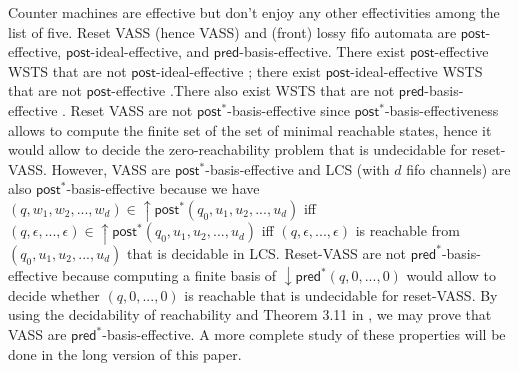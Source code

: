\documentclass[runningheads]{llncs}
\newcommand{\alain}[1]{\todo[inline,color=red!20]{{\bf AF:} #1}}
\newcommand{\pred}{\textsf{pred}}
\newcommand{\post}{\textsf{post}}
\begin{document}
%
Counter machines are effective but don't enjoy any other effectivities among the list of five.
Reset VASS (hence VASS) and (front) lossy fifo automata are $\post$-effective, $\post$-ideal-effective, and $\pred$-basis-effective. There exist $\post$-effective WSTS that are not $\post$-ideal-effective \cite[Proposition~35]{BFM-ic17}; there exist $\post$-ideal-effective WSTS that are not $\post$-effective \cite[Proposition~36]{BFM-ic17}.There also exist WSTS that are not $\pred$-basis-effective \cite[Proposition~45]{BFM-ic17}.
Reset VASS are not $\post^*$-basis-effective since $\post^*$-basis-effectiveness allows to compute the finite set of the set of minimal reachable states, hence it would allow to decide the zero-reachability problem that is undecidable for reset-VASS. However, VASS are $\post^*$-basis-effective \cite[Proposition 2]{DBLP:conf/gg/Ozkan22} and LCS (with $d$ fifo channels) are also $\post^*$-basis-effective because we have $(q,w_1,w_2,...,w_d) \in \mathop{\uparrow} \post^*(q_0,u_1,u_2,...,u_d)$ iff $(q,\epsilon,...,\epsilon)  \in \mathop{\uparrow} \post^*(q_0,u_1,u_2,...,u_d)$ iff $(q,\epsilon,...,\epsilon)$ is reachable from $(q_0,u_1,u_2,...,u_d)$ that is decidable in LCS.
%
Reset-VASS are not $\pred^*$-basis-effective because computing a finite basis of $\mathop{\downarrow} \pred^*(q,0,...,0)$ would allow to decide whether $(q,0,...,0)$ is reachable that is undecidable for reset-VASS.
By using the decidability of reachability and Theorem 3.11 in \cite{DBLP:journals/acta/ValkJ85}, we may prove that VASS are $\pred^*$-basis-effective. A more complete study of these properties will be done in the long version of this paper.





\end{document}
